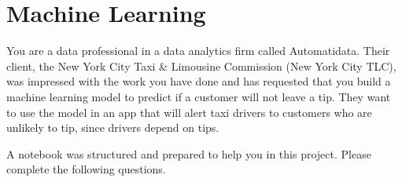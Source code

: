 \documentclass[letterpaper,10pt,english]{sphinxmanual}
\begin{document}
\chapter{Machine Learning}
\label{\detokenize{Automatidata_Machine Learning:machine-learning}}\label{\detokenize{Automatidata_Machine Learning::doc}}
\sphinxAtStartPar
You are a data professional in a data analytics firm called Automatidata. Their client, the New York City Taxi \& Limousine Commission (New York City TLC), was impressed with the work you have done and has requested that you build a machine learning model to predict if a customer will not leave a tip. They want to use the model in an app that will alert taxi drivers to customers who are unlikely to tip, since drivers depend on tips.

\sphinxAtStartPar
A notebook was structured and prepared to help you in this project. Please complete the following questions.
\end{document}
